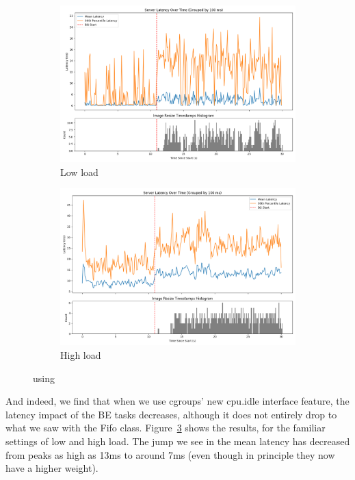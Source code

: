 \begin{figure}[t]
    \centering
    \begin{subfigure}[t]{0.49\columnwidth}
        \includegraphics[width=\columnwidth]{graphs/unedited-idle-low-two.png}
        \caption{Low load}\label{fig:unedited-idle-low-two}
    \end{subfigure}
    \hspace{\fill}
    \begin{subfigure}[t]{0.49\columnwidth}
        \includegraphics[width=\columnwidth]{graphs/unedited-idle-high-two.png}
        \caption{High load}\label{fig:unedited-idle-high-two}
    \end{subfigure}
    \vspace{4pt}
    \caption{using \schedidle{}}\label{fig:unedited-idle}
\end{figure}

And indeed, we find that when we use cgroups' new cpu.idle interface feature,
the latency impact of the BE tasks decreases, although it does not entirely drop
to what we saw with the Fifo class. Figure~\ref{fig:unedited-idle} shows the
results, for the familiar settings of low and high load. The jump we see in the
mean latency has decreased from peaks as high as 13ms to around 7ms (even though
in principle they now have a higher weight).


